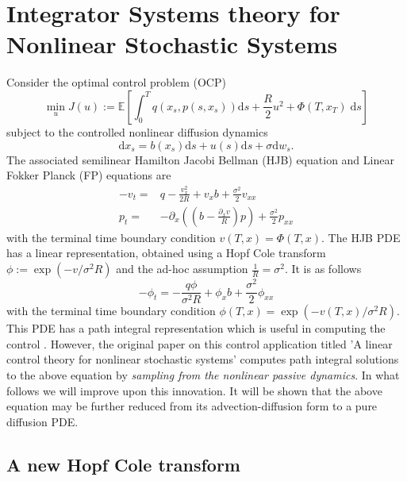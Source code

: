 \documentclass[letterpaper, 12pt]{article}
\newcommand{\rd}{{\mathrm d}}
\newcommand{\Eb}{\mathbb{E}}
\begin{document}
\section{Integrator Systems theory for Nonlinear Stochastic Systems}
\label{sec:HopfCole}


Consider the optimal control problem (OCP)
\begin{equation}
\underset{u}{\min} J(u) := \Eb \left[ \int_{0}^{T} q(x_s,p(s,x_s)) \rd s + \frac{R}{2}u^2 + \Phi(T,x_T) \; \rd s \right] \label{OCP}
\end{equation}
subject to the controlled nonlinear diffusion dynamics
\begin{equation}
\rd x_s = b(x_s) \rd s + u(s) \rd s + \sigma \rd w_s. \label{dyn}
\end{equation}
The associated semilinear Hamilton Jacobi Bellman (HJB) equation and Linear Fokker Planck (FP) equations are
\begin{align}
-v_t =& q - \frac{v_x^2}{2R} + v_x b + \frac{\sigma^2}{2} v_{xx} \label{HJB} \\
p_t =& - \partial_x ((b - \frac{\partial_x v}{R})p) + \frac{\sigma^2}{2} p_{xx} \label{FP}
\end{align}
with the terminal time boundary condition $v(T,x) = \Phi(T,x)$. The HJB PDE has a linear representation, obtained using a Hopf Cole transform $\phi := \exp(-v/\sigma^2 R)$ and the ad-hoc assumption $\frac{1}{R} = \sigma^2$. It is as follows
\begin{equation}
-\phi_t = -\frac{q \phi}{\sigma^2 R} + \phi_x b + \frac{\sigma^2}{2} \phi_{xx} \label{HopfColeHJB}
\end{equation}
with the terminal time boundary condition $\phi(T,x) = \exp(-v(T,x)/\sigma^2 R)$. This PDE has a path integral representation \cite{Fleming1978} which is useful in computing the control \cite{Kappen2005a, Kappen2005b, Theodorou2011IPI}. However, the original paper on this control application titled 'A linear control theory for nonlinear stochastic systems' \cite{Kappen2005a} computes path integral solutions to the above equation by \textit{sampling from the nonlinear passive dynamics}. In what follows we will improve upon this innovation. It will be shown that the above equation may be further reduced from its advection-diffusion form to a pure diffusion PDE.

\subsection{A new Hopf Cole transform} \label{sec:newHopfCol}
\end{document}

